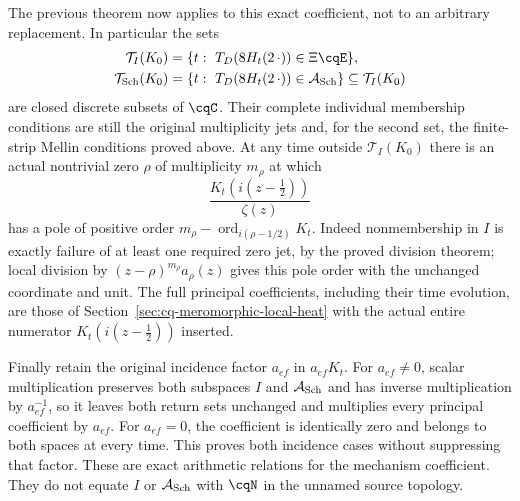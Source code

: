 The previous theorem now applies to this exact coefficient,
not to an arbitrary replacement. In particular the sets
\begin{equation}\label{eq:cq-xi4-arithmetic-return-times}
 \begin{aligned}
 \mathcal T_I(K_0)
    &=\{t:\ T_D(8H_t(2\,\cdot))\in\Xi\cqE\},\\
 \mathcal T_{\rm Sch}(K_0)
    &=\{t:\ T_D(8H_t(2\,\cdot))\in\mathcal A_{\rm Sch}\}
       \subseteq\mathcal T_I(K_0)
 \end{aligned}
\end{equation}
are closed discrete subsets of $\cqC$.
Their complete individual membership conditions are still the
original multiplicity jets and, for the second set, the
finite-strip Mellin conditions proved above.
At any time outside $\mathcal T_I(K_0)$ there is an actual
nontrivial zero $\rho$ of multiplicity $m_\rho$ at which
\[
 \frac{K_t(i(z-\tfrac12))}{\zeta(z)}
\]
has a pole of positive order
$m_\rho-\operatorname{ord}_{i(\rho-1/2)}K_t$.
Indeed nonmembership in $I$ is exactly failure of at least
one required zero jet, by the proved division theorem; local
division by $(z-\rho)^{m_\rho}a_\rho(z)$ gives this pole order
with the unchanged coordinate and unit.
The full principal coefficients, including their time evolution,
are those of Section~\ref{sec:cq-meromorphic-local-heat}
with the actual entire numerator
$K_t(i(z-\tfrac12))$ inserted.

Finally retain the original incidence factor $a_{ef}$ in
$a_{ef}K_t$. For $a_{ef}\ne0$, scalar multiplication preserves
both subspaces $I$ and $\mathcal A_{\rm Sch}$ and has inverse
multiplication by $a_{ef}^{-1}$, so it leaves both return sets
unchanged and multiplies every principal coefficient by $a_{ef}$.
For $a_{ef}=0$, the coefficient is identically zero and belongs
to both spaces at every time. This proves both incidence cases
without suppressing that factor.
These are exact arithmetic relations for the mechanism coefficient.
They do not equate $I$ or $\mathcal A_{\rm Sch}$ with $\cqN$
in the unnamed source topology.

